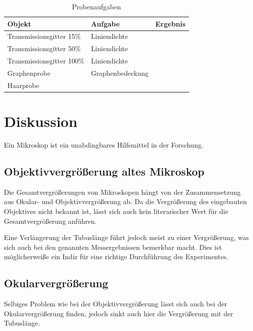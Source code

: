\documentclass[12pt,a4paper,twoside]{article}
\begin{document}
\begin{table}[H]
    \centering
    \caption{Probenaufgaben}
    \label{tab:Probenaufgabe}
    \begin{tabular}{| l | l | l |}
        \hline
        Objekt & Aufgabe & Ergebnis \\
        \hline
        Transmissionsgitter 15$\%$ & Liniendichte &  \\
        Transmissionsgitter 50$\%$ & Liniendichte &  \\
        Transmissionsgitter 100$\%$ & Liniendichte &  \\
        Graphenprobe & Graphenbedeckung &  \\
        Haarprobe & & \\
        \hline
    \end{tabular}
\end{table}


\section{Diskussion} %

Ein Mikroskop ist ein unabdingbares Hilfsmittel in der Forschung. 

\subsection{Objektivvergrößerung altes Mikroskop}

Die Gesamtvergrößerungen von Mikroskopen hängt von der Zusammensetzung aus Okular- und Objektivvergrößerung ab.
Da die Vergrößerung des eingebauten Objektives nicht bekannt ist, lässt sich auch kein literarischer Wert für die Gesamtvergrößerung anführen. \newline

\noindent
Eine Verlängerung der Tubuslänge führt jedoch meist zu einer Vergrößerung, was sich auch bei den genannten Messergebnissen bemerkbar macht. 
Dies ist möglicherweiße ein Indiz für eine richtige Durchführung des Experimentes. 

\subsection{Okularvergrößerung}

Selbiges Problem wie bei der Objektivvergrößerung lässt sich auch bei der Okularvergrößerung finden, jedoch sinkt auch hier die Vergrößerung mit der Tubuslänge. 
\end{document}
